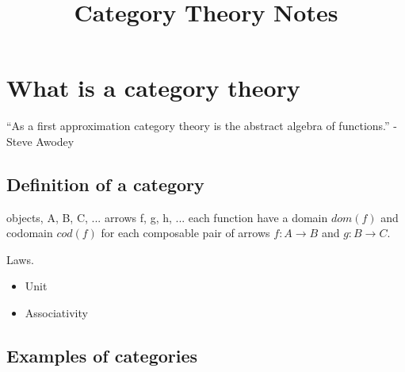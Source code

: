 \documentclass{article}
\title{Category Theory Notes}
\author{}
\theoremstyle{definition}
\newcommand{\arr}[3]{#1 : #2 \rightarrow #3}
\begin{document}
\maketitle

\section{What is a category theory}

``As a first approximation category theory is the abstract algebra of
functions.'' - Steve Awodey

\subsection{Definition of a category}

objects, A, B, C, ...
arrows f, g, h, ...
each function have a domain $dom(f)$ and codomain $cod(f)$
for each composable pair of arrows $\arr{f}{A}{B}$ and $\arr{g}{B}{C}$.

Laws.

\begin{itemize}
  \item Unit
  \item Associativity
\end{itemize}

\subsection{Examples of categories}
\end{document}
